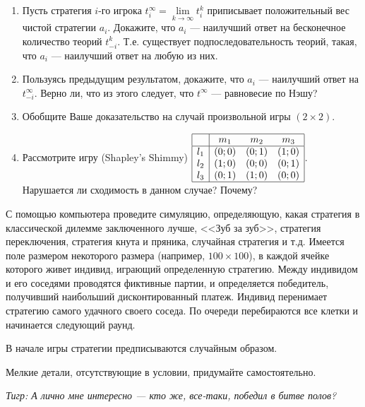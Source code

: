 \begin{problem}
\begin{enumerate}
\item Пусть стратегия  $i$-го игрока  $t_{i}^{\infty } =\mathop{\lim }\limits_{k\to \infty } t_{i}^{k} $  приписывает положительный вес чистой стратегии  $a_{i} $. Докажите, что  $a_{i} $  --- наилучший ответ на бесконечное количество теорий  $t_{-i}^{k} $. Т.е. существует подпоследовательность теорий, такая, что  $a_{i} $  --- наилучший ответ на любую из них.\par
\item Пользуясь предыдущим результатом, докажите, что  $a_{i} $  --- наилучший ответ на  $t_{-i}^{\infty } $. Верно ли, что из этого следует, что  $t^{\infty}$  --- равновесие по Нэшу?\par
\item Обобщите Ваше доказательство на случай произвольной игры  $\left(2\times 2\right)$.\par
\item Рассмотрите игру (Shapley's Shimmy)  $\begin{array}{|c|ccc|}  \hline {} & {m_{1} } & {m_{2} } & {m_{3} } \\  \hline {l_{1} } & {\left(0;0\right)} & {\left(0;1\right)} & {\left(1;0\right)} \\ {l_{2} } & {\left(1;0\right)} & {\left(0;0\right)} & {\left(0;1\right)} \\ {l_{3} } & {\left(0;1\right)} & {\left(1;0\right)} & {\left(0;0\right)} \\  \hline  \end{array}$. Нарушается ли сходимость в данном случае? Почему?
\end{enumerate}


\begin{sol} \end{sol}
\end{problem}



\begin{problem}
С помощью компьютера проведите симуляцию, определяющую, какая стратегия в классической дилемме заключенного лучше, <<Зуб за зуб>>, стратегия переключения, стратегия кнута и пряника, случайная стратегия и т.д.
Имеется поле размером некоторого размера (например,  $100\times 100$), в каждой ячейке которого живет индивид, играющий определенную стратегию.
Между индивидом и его соседями проводятся фиктивные партии, и определяется победитель, получивший наибольший дисконтированный платеж. Индивид перенимает стратегию самого удачного своего соседа. По очереди перебираются все клетки и начинается следующий раунд.\par
В начале игры стратегии предписываются случайным образом.\par
Мелкие детали, отсутствующие в условии, придумайте самостоятельно.\par
{\it Тигр: А лично мне интересно --- кто же, все-таки, победил в битве полов? }
\begin{sol} \end{sol}
\end{problem}



